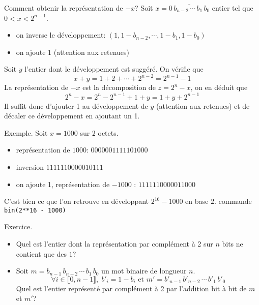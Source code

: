 Comment obtenir la représentation de $-x$?\newline
Soit $x = \overline{0\,b_{n-2}\,\cdots\, b_1\, b_0}$ entier tel que $0<x<2^{n-1}$.  
\begin{itemize}
  \item on inverse le développement: $(1,1-b_{n-2},\cdots,1-b_1,1-b_0)$
  \item on ajoute $1$ (attention aux retenues)
\end{itemize}
\begin{demo}
 Soit $y$ l'entier dont le développement est suggéré. On vérifie que
\begin{displaymath}
 x+y = 1+2+\cdots+2^{n-2} = 2^{n-1}-1
\end{displaymath}
La représentation de $-x$ est la décomposition de $z = 2^{n}-x$, on en déduit que
\begin{displaymath}
 2^{n}-x = 2^{n} - 2^{n-1} + 1 +y=1+y+2^{n-1}
\end{displaymath}
Il suffit donc d'ajouter 1 au développement de $y$ (attention aux retenues) et de décaler ce développement en ajoutant un 1.\newline  
\end{demo}
Exemple. Soit $x=1000$ sur 2 octets.
\begin{itemize}
  \item représentation de $1000$: $0000001111101000$
  \item inversion $1111110000010111$
  \item on ajoute 1, représentation de $-1000$ : $1111110000011000$ 
\end{itemize}
C'est bien ce que l'on retrouve en développant $2^{16}-1000$ en base $2$.\newline
commande \texttt{bin(2**16 - 1000)}

Exercice.
\begin{itemize}
  \item Quel est l'entier dont la représentation par complément à 2 sur $n$ bits ne contient que des $1$?
  \item Soit $m = b_{n-1}\,b_{n-2}\,\cdots\,b_1\,b_0$ un mot binaire de longueur $n$.
\begin{displaymath}
  \forall i\in \llbracket 0,n-1\rrbracket, \; b'_i = 1-b_i \text{ et } m' = b'_{n-1}\,b'_{n-2}\,\cdots\,b'_1\,b'_0
\end{displaymath}
  Quel est l'entier représenté par complément à 2 par l'addition bit à bit de $m$ et $m'$? 
\end{itemize}

